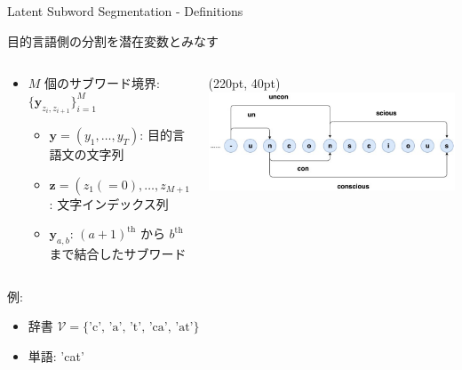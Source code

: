 \documentclass[unicode, 12pt, aspectratio=43]{beamer}
\begin{document}
\begin{frame}[label={sec:org652d584}]{Latent Subword Segmentation - Definitions}
\begin{block}{\hspace{-0.75cm}目的言語側の分割を潜在変数とみなす}
\begin{columns}
\begin{column}{1.0\columnwidth}
\begin{itemize}
\item \(M\) 個のサブワード境界: \(\{\boldsymbol{y}_{z_i, z_{i+1}}\}_{i=1}^M\)
\begin{itemize}
\item \(\boldsymbol{y} = (y_1, \ldots, y_T)\): 目的言語文の文字列
\item \(\boldsymbol{z} = (z_1 (=0),\ldots,z_{M+1} (=T))\): 文字インデックス列
\item \(\boldsymbol{y}_{a,b}\): \((a+1)^\text{th}\) から \(b^\text{th}\) まで結合したサブワード
\end{itemize}
\end{itemize}
\end{column}

\begin{column}{0.465\columnwidth}
\begin{textblock*}{\linewidth}(220pt, 40pt)
    \centering
    \includegraphics[width=\linewidth]{./figure/Figure1.pdf}
\end{textblock*}
\end{column}
\end{columns}
\end{block}

\begin{columns}
\begin{column}{0.5\columnwidth}
\begin{block}{例:}
\footnotesize
\begin{itemize}
\item 辞書 \(\mathcal{V} = \{\text{'c', 'a', 't', 'ca', 'at'}\}\)
\item 単語: 'cat'
\end{itemize}
\end{block}
\end{column}


\end{columns}
\end{frame}
\end{document}
